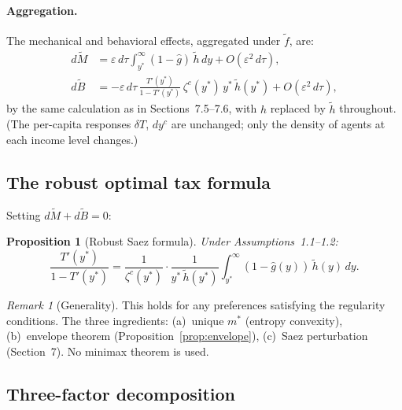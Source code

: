 \documentclass[12pt,a4paper]{article}
\theoremstyle{definition}
\theoremstyle{plain}
\newtheorem{proposition}{Proposition}[section]
\theoremstyle{remark}
\newtheorem{remark}{Remark}[section]
\begin{document}
\paragraph{Aggregation.}
The mechanical and behavioral effects, aggregated under
$\widetilde{f}$, are:
\begin{align}
  d\widetilde{M}
  &= \varepsilon\,d\tau
  \int_{y^*}^\infty (1 - \hat{g})\,\widetilde{h}\,dy
  + O(\varepsilon^2\,d\tau),
  \label{eq:dM_agg} \\
  d\widetilde{B}
  &= -\varepsilon\,d\tau\,
  \frac{T'(y^*)}{1-T'(y^*)}\,\zeta^c(y^*)\,y^*\,
  \widetilde{h}(y^*)
  + O(\varepsilon^2\,d\tau),
  \label{eq:dB_agg}
\end{align}
by the same calculation as in Sections~7.5--7.6, with
$h$ replaced by $\widetilde{h}$ throughout.  (The
per-capita responses $\delta T$, $dy^c$ are unchanged;
only the density of agents at each income level changes.)


\subsection{The robust optimal tax formula}
\label{sec:robust_formula}

Setting $d\widetilde{M} + d\widetilde{B} = 0$:

\begin{proposition}[Robust Saez formula]
\label{prop:robust_saez}
Under Assumptions~1.1--1.2:
\begin{equation}
\label{eq:robust_saez}
  \boxed{
  \frac{T'(y^*)}{1 - T'(y^*)}
  = \frac{1}{\zeta^c(y^*)}
  \cdot \frac{1}{y^*\,\widetilde{h}(y^*)}
  \int_{y^*}^\infty
  (1 - \hat{g}(y))\,\widetilde{h}(y)\,dy.
  }
\end{equation}
\end{proposition}

\begin{remark}[Generality]
This holds for any preferences satisfying the regularity
conditions.  The three ingredients:
(a)~unique $m^*$ (entropy convexity),
(b)~envelope theorem (Proposition~\ref{prop:envelope}),
(c)~Saez perturbation (Section~7).
No minimax theorem is used.
\end{remark}


\subsection{Three-factor decomposition}
\label{sec:three_factor}
\end{document}
